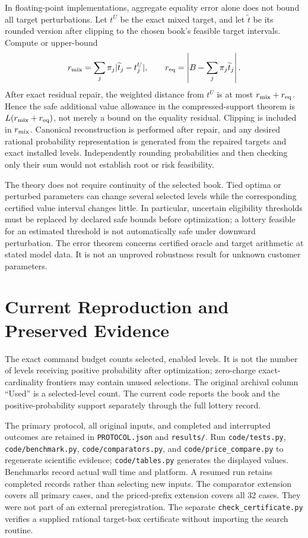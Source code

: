 In floating-point implementations, aggregate equality error alone does not bound all target perturbations. Let $t^U$ be the exact mixed target, and let $\widetilde t$ be its rounded version after clipping to the chosen book's feasible target intervals. Compute or upper-bound
\[
 r_{\rm mix}=\sum_j\pi_j|\widetilde t_j-t_j^U|,
 \qquad r_{\rm eq}=\left|B-\sum_j\pi_j\widetilde t_j\right|.
\]
After exact residual repair, the weighted distance from $t^U$ is at most $r_{\rm mix}+r_{\rm eq}$. Hence the safe additional value allowance in the compressed-support theorem is $L(r_{\rm mix}+r_{\rm eq})$, not merely a bound on the equality residual. Clipping is included in $r_{\rm mix}$. Canonical reconstruction is performed after repair, and any desired rational probability representation is generated from the repaired targets and exact installed levels. Independently rounding probabilities and then checking only their sum would not establish root or risk feasibility.

The theory does not require continuity of the selected book. Tied optima or perturbed parameters can change several selected levels while the corresponding certified value interval changes little. In particular, uncertain eligibility thresholds must be replaced by declared safe bounds before optimization; a lottery feasible for an estimated threshold is not automatically safe under downward perturbation. The error theorem concerns certified oracle and target arithmetic at stated model data. It is not an unproved robustness result for unknown customer parameters.


\section{Current Reproduction and Preserved Evidence}\label{ec:r45-protocol}\label{ec:r45-preservation}\label{sec:r45-study}
The exact command budget counts selected, enabled levels. It is not the number of levels receiving positive probability after optimization; zero-charge exact-cardinality frontiers may contain unused selections. The original archival column ``Used'' is a selected-level count. The current code reports the book and the positive-probability support separately through the full lottery record.

The primary protocol, all original inputs, and completed and interrupted outcomes are retained in \texttt{PROTOCOL.json} and \texttt{results/}. Run \texttt{code/tests.py}, \texttt{code/benchmark.py}, \texttt{code/comparators.py}, and \texttt{code/price\_compare.py} to regenerate scientific evidence; \texttt{code/tables.py} generates the displayed values. Benchmarks record actual wall time and platform. A resumed run retains completed records rather than selecting new inputs. The comparator extension covers all primary cases, and the priced-prefix extension covers all 32 cases. They were not part of an external preregistration. The separate \texttt{check\_certificate.py} verifies a supplied rational target-box certificate without importing the search routine.

